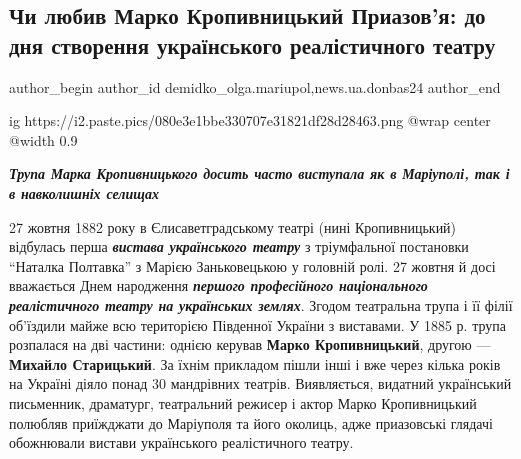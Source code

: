  
 
 
 
 
 
\subsection{Чи любив Марко Кропивницький Приазов'я: до дня створення українського реалістичного театру}
\label{sec:27_10_2022.stz.news.ua.donbas24.1.chy_ljubyv_marko_kropyvnyckyj_priazovja_stvorennja_ukr_realistic_teatr}
 
\ifcmt
 author_begin
   author_id demidko_olga.mariupol,news.ua.donbas24
 author_end
\fi

\ifcmt
  ig https://i2.paste.pics/080e3e1bbe330707e31821df28d28463.png
  @wrap center
  @width 0.9
\fi

\begin{center}
  \em\color{blue}\bfseries\Large
Трупа Марка Кропивницького досить часто виступала як в Маріуполі, так і в навколишніх селищах
\end{center}

27 жовтня 1882 року в Єлисаветградському театрі (нині Кропивницький) відбулась
перша \emph{\textbf{вистава українського театру}} з тріумфальної постановки \enquote{Наталка Полтавка}
з Марією Заньковецькою у головній ролі. 27 жовтня й досі вважається Днем
народження \textbf{\emph{першого професійного національного реалістичного театру на
українських землях}}. Згодом театральна трупа і її філії об'їздили майже всю
територією Південної України з виставами. У 1885 р. трупа розпалася на дві
частини: однією керував \textbf{Марко Кропивницький}, другою — \textbf{Михайло Старицький}. За
їхнім прикладом пішли інші і вже через кілька років на Україні діяло понад 30
мандрівних театрів. Виявляється, видатний український письменник, драматург,
театральний режисер і актор Марко Кропивницький полюбляв приїжджати до
Маріуполя та його околиць, адже приазовські глядачі обожнювали вистави
українського реалістичного театру.

